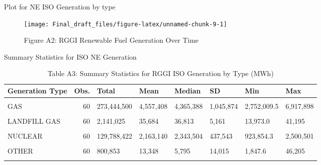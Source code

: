 \documentclass[
]{article}
\begin{document}
Plot for NE ISO Generation by type

\begin{figure}

{\centering \texttt{[image: Final\_draft\_files/figure-latex/unnamed-chunk-9-1]} 

}

\caption{Figure A2: RGGI Renewable Fuel Generation Over Time}\label{fig:unnamed-chunk-9}
\end{figure}

Summary Statistics for ISO NE Generation

\begin{longtable}[t]{lrllllll}
\caption{\label{tab:unnamed-chunk-10}Table A3: Summary Statistics for RGGI ISO Generation by Type (MWh)}\\
\toprule
Generation Type & Obs. & Total & Mean & Median & SD & Min & Max\\
\midrule
\cellcolor{gray!10}{COAL} & \cellcolor{gray!10}{60} & \cellcolor{gray!10}{1,438,965} & \cellcolor{gray!10}{23,983} & \cellcolor{gray!10}{5,984} & \cellcolor{gray!10}{46,617} & \cellcolor{gray!10}{14.8} & \cellcolor{gray!10}{253,853}\\
GAS & 60 & 273,444,500 & 4,557,408 & 4,365,388 & 1,045,874 & 2,752,009.5 & 6,917,898\\
\cellcolor{gray!10}{HYDRO} & \cellcolor{gray!10}{60} & \cellcolor{gray!10}{40,679,356} & \cellcolor{gray!10}{677,989} & \cellcolor{gray!10}{687,954} & \cellcolor{gray!10}{199,776} & \cellcolor{gray!10}{253,753.8} & \cellcolor{gray!10}{998,469}\\
LANDFILL GAS & 60 & 2,141,025 & 35,684 & 36,813 & 5,161 & 13,973.0 & 41,195\\
\cellcolor{gray!10}{METHANE} & \cellcolor{gray!10}{60} & \cellcolor{gray!10}{193,478} & \cellcolor{gray!10}{3,225} & \cellcolor{gray!10}{3,265} & \cellcolor{gray!10}{374} & \cellcolor{gray!10}{2,356.5} & \cellcolor{gray!10}{3,985}\\
\addlinespace
NUCLEAR & 60 & 129,788,422 & 2,163,140 & 2,343,504 & 437,543 & 923,854.3 & 2,500,501\\
\cellcolor{gray!10}{OIL} & \cellcolor{gray!10}{60} & \cellcolor{gray!10}{2,864,685} & \cellcolor{gray!10}{47,745} & \cellcolor{gray!10}{7,691} & \cellcolor{gray!10}{148,417} & \cellcolor{gray!10}{447.8} & \cellcolor{gray!10}{1,030,184}\\
OTHER & 60 & 800,853 & 13,348 & 5,795 & 14,015 & 1,847.6 & 46,205\\
\cellcolor{gray!10}{PRD} & \cellcolor{gray!10}{60} & \cellcolor{gray!10}{111,037} & \cellcolor{gray!10}{1,851} & \cellcolor{gray!10}{1,292} & \cellcolor{gray!10}{2,067} & \cellcolor{gray!10}{2.7} & \cellcolor{gray!10}{13,261}\\

\end{longtable}
\end{document}
